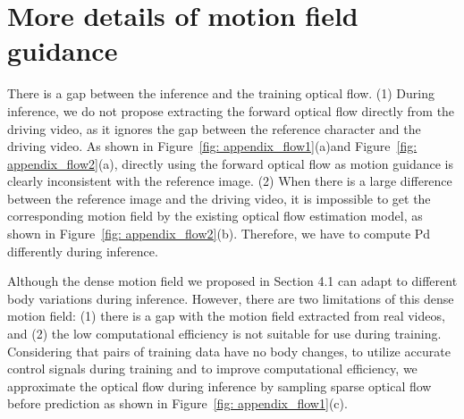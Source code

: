 {
\section{More details of motion field guidance}
There is a gap between the inference and the training optical flow. 
(1) During inference, we do not propose extracting the forward optical flow directly from the driving video, as it ignores the gap between the reference character and the driving video. As shown in Figure~\ref{fig: appendix_flow1}(a)and Figure~\ref{fig: appendix_flow2}(a), directly using the forward optical flow as motion guidance is clearly inconsistent with the reference image.
(2) When there is a large difference between the reference image and the driving video, it is impossible to get the corresponding motion field by the existing optical flow estimation model, as shown in Figure~\ref{fig: appendix_flow2}(b). Therefore, we have to compute Pd differently during inference.
}
{
Although the dense motion field we proposed in Section 4.1 can adapt to different body variations during inference. However, there are two limitations of this dense motion field: (1) there is a gap with the motion field extracted from real videos, and (2) the low computational efficiency is not suitable for use during training. Considering that pairs of training data have no body changes, to utilize accurate control signals during training and to improve computational efficiency, we approximate the optical flow during inference by sampling sparse optical flow before prediction as shown in Figure~\ref{fig: appendix_flow1}(c). 
}

